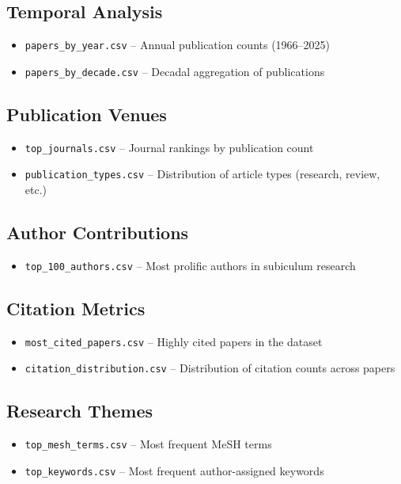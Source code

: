 \documentclass{../latex/analysis_report}
\begin{document}
\subsection{Temporal Analysis}
\begin{itemize}[noitemsep]
    \item \texttt{papers\_by\_year.csv} -- Annual publication counts (1966--2025)
    \item \texttt{papers\_by\_decade.csv} -- Decadal aggregation of publications
\end{itemize}

\subsection{Publication Venues}
\begin{itemize}[noitemsep]
    \item \texttt{top\_journals.csv} -- Journal rankings by publication count
    \item \texttt{publication\_types.csv} -- Distribution of article types (research, review, etc.)
\end{itemize}

\subsection{Author Contributions}
\begin{itemize}[noitemsep]
    \item \texttt{top\_100\_authors.csv} -- Most prolific authors in subiculum research
\end{itemize}

\subsection{Citation Metrics}
\begin{itemize}[noitemsep]
    \item \texttt{most\_cited\_papers.csv} -- Highly cited papers in the dataset
    \item \texttt{citation\_distribution.csv} -- Distribution of citation counts across papers
\end{itemize}

\subsection{Research Themes}
\begin{itemize}[noitemsep]
    \item \texttt{top\_mesh\_terms.csv} -- Most frequent MeSH terms
    \item \texttt{top\_keywords.csv} -- Most frequent author-assigned keywords
\end{itemize}
\end{document}
